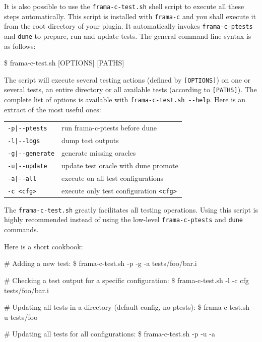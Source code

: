 It is also possible to use the \verb+frama-c-test.sh+ shell script to execute
all these steps automatically. This script is installed with \verb+frama-c+
and you shall execute it from the root directory of your plugin. It automatically
invokes \verb+frama-c-ptests+ and \verb+dune+ to prepare, run and update tests.
The general command-line syntax is as follows:

\begin{shell}
\$ frama-c-test.sh [OPTIONS] [PATHS]
\end{shell}

The script will execute several testing actions (defined by \verb+[OPTIONS]+) on
one or several tests, an entire directory or all available tests
(according to \verb+[PATHS]+). The complete list of options is available with
\verb+frama-c-test.sh --help+. Here is an extract of the most useful ones:

\begin{center}
\begin{tabular}{l@{\quad}l}
\hline
\verb$-p|--ptests$     & run frama-c-ptests before dune \\
\verb$-l|--logs$       & dump test outputs \\
\verb$-g|--generate$   & generate missing oracles \\
\verb$-u|--update$     & update test oracle with dune promote \\
\verb$-a|--all$        & execute on all test configurations \\
\verb$-c <cfg>$        & execute only test configuration \verb+<cfg>+ \\
\hline
\end{tabular}
\end{center}

The \verb+frama-c-test.sh+ greatly facilitates all testing operations.
Using this script is highly recommended instead of using the
low-level \verb+frama-c-ptests+ and \verb+dune+ commands.

Here is a short cookbook:
\begin{shell}
# Adding a new test:
\$ frama-c-test.sh -p -g -a tests/foo/bar.i

# Checking a test output for a specific configuration:
\$ frama-c-test.sh -l -c cfg tests/foo/bar.i

# Updating all tests in a directory (default config, no ptests):
\$ frama-c-test.sh -u tests/foo

# Updating all tests for all configurations:
\$ frama-c-test.sh -p -u -a
\end{shell}

